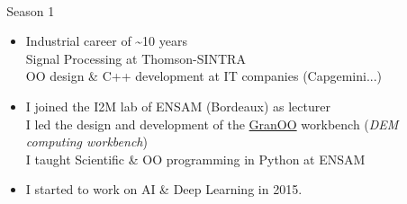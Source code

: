 \documentclass[11pt, serif, mathserif, compress]{beamer}  %
\begin{document}
\begin{frame}{}
  

  \begin {bclogo}[noborder=true, couleur=gray!20, couleurBarre=Chocolate, logo=\bctrombone, marge=0, margeG=-0.6]
    {\ }

    \begin {bclogo}[noborder=true, couleur=gray!20, couleurBarre=DarkGray, logo=\raisebox{1mm}{\,\huge⚙}, marge=0, margeG=0.02, margeD=-0.5]{\,Season 1}
      \medskip
      \begin{itemize}\setlength\itemsep{3mm}
      \item Industrial career of \textasciitilde 10 years\\
        {\small Signal Processing at Thomson-SINTRA\\
          OO design \& C++ development at IT companies (Capgemini...)}
      \item I joined the I2M lab of ENSAM (Bordeaux) as lecturer\\
        I led the design and development of the \href{https://doi.org/10.1016/j.advengsoft.2014.04.003}{GranOO} workbench
          ({\em DEM computing workbench})\\
          I taught Scientific \& OO programming in Python at ENSAM\\
        \item I started to work on AI \& Deep Learning in 2015.
      \end{itemize}
    \end{bclogo}
    
    \vspace*{-3mm}%
  \end{bclogo}

\end{frame}
\end{document}
